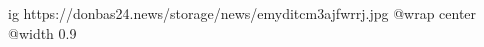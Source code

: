  
 
 
 
 

\ifcmt
  ig https://donbas24.news/storage/news/emyditcm3ajfwrrj.jpg
  @wrap center
  @width 0.9
\fi

